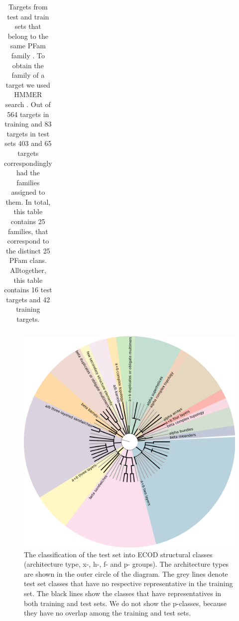 \documentclass[a4paper,10pt]{article}
\begin{document}
\begin{table}[H]
\begin{center}
\begin{tabular}{ l | l | l }
\end{tabular}
    
\caption {Targets from test and train sets that belong to the same PFam family \cite{}. To obtain the family of a target we used HMMER search \cite{}.
Out of 564 targets in training and 83 targets in test sets 403 and 65 targets correspondingly had the families assigned to them. In total, this 
table contains 25 families, that correspond to the distinct 25 PFam clans. Alltogether, this table contains 16 test targets and 42 training targets.}
\label{Tbl:SharedPFam}
\end{center}
\end{table}

\begin{figure}[H]
    \centering
    \includegraphics[width=\linewidth]{Fig/folds_graph.png}
    \caption{The classification of the test set into ECOD structural classes (architecture type, x-, h-, f- and p- groups). The architecture 
    types are shown in the outer circle of the diagram. The grey lines denote test set classes that have no respective representative in the 
    training set. The black lines show the classes that have representatives in both training and test sets. We do not show the p-classes, because
    they have no overlap among the training and test sets.}
    \label{Fig:foldsGraph}
\end{figure}
\end{document}
